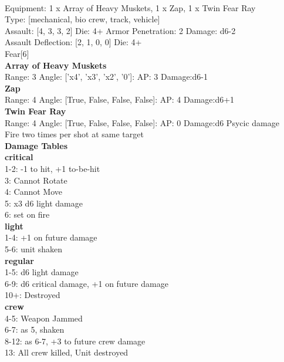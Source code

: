  \\
Equipment: 1 x Array of Heavy Muskets, 1 x Zap, 1 x Twin Fear Ray \\
Type: [mechanical, bio crew, track, vehicle] \\

Assault: [4, 3, 3, 2] Die: 4+ Armor Penetration: 2 Damage: d6-2 \\
Assault Deflection: [2, 1, 0, 0] Die: 4+\\
\indent Fear[6]\\ 
 



{\bf Array of Heavy Muskets } \\



Range: 3  Angle: ['x4', 'x3', 'x2', '0']: AP: 3 Damage:d6-1 \\




{\bf Zap } \\



Range: 4  Angle: [True, False, False, False]: AP: 4 Damage:d6+1 \\




{\bf Twin Fear Ray } \\



Range: 4  Angle: [True, False, False, False]: AP: 0 Damage:d6 Psycic damage \\
Fire two times per shot at same target\\ 




 





{\bf Damage Tables} \\
 {\bf critical } \\
1-2: -1 to hit, +1 to-be-hit \\
3: Cannot Rotate \\
4: Cannot Move \\
5: x3 d6 light damage \\
6: set on fire \\
 {\bf light } \\
1-4: +1 on future damage \\
5-6: unit shaken \\
 {\bf regular } \\
1-5: d6 light damage \\
6-9: d6 critical damage, +1 on future damage \\
10+: Destroyed \\
 {\bf crew } \\
4-5: Weapon Jammed \\
6-7: as 5, shaken \\
8-12: as 6-7, +3 to future crew damage \\
13: All crew killed, Unit destroyed \\










